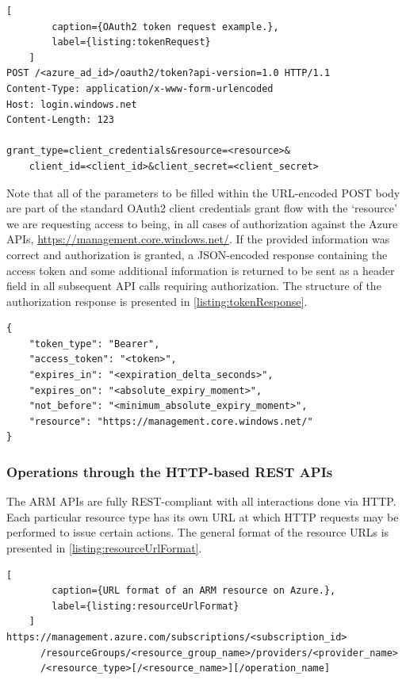\documentclass[11pt]{report}
\begin{document}
\begin{lstlisting}[
        caption={OAuth2 token request example.},
        label={listing:tokenRequest}
    ]
POST /<azure_ad_id>/oauth2/token?api-version=1.0 HTTP/1.1
Content-Type: application/x-www-form-urlencoded
Host: login.windows.net
Content-Length: 123

grant_type=client_credentials&resource=<resource>&
    client_id=<client_id>&client_secret=<client_secret>
\end{lstlisting}

Note that all of the parameters to be filled within the URL-encoded POST body
are part of the standard OAuth2 client credentials grant flow with the
`resource' we are requesting access to being, in all cases of authorization
against the Azure APIs, \url{https://management.core.windows.net/}.
If the provided information was correct and authorization is granted,
a JSON-encoded response containing the access token and some
additional information is returned to be sent as a header field in all
subsequent API calls requiring authorization. The structure of the
authorization response is presented in \autoref{listing:tokenResponse}.

\begin{listing}[H]
\caption{JSON structure of OAuth2 token response.}
\label{listing:tokenResponse}
\begin{verbatim}
{
    "token_type": "Bearer",
    "access_token": "<token>",
    "expires_in": "<expiration_delta_seconds>",
    "expires_on": "<absolute_expiry_moment>",
    "not_before": "<minimum_absolute_expiry_moment>",
    "resource": "https://management.core.windows.net/"
}
\end{verbatim}
\end{listing}

\subsubsection{Operations through the HTTP-based REST APIs}

The ARM APIs are fully REST-compliant with all interactions done via HTTP\@. Each
particular resource type has its own URL at which HTTP requests may be
performed to issue certain actions. The general format of the resource URLs is
presented in \autoref{listing:resourceUrlFormat}.

\begin{lstlisting}[
        caption={URL format of an ARM resource on Azure.},
        label={listing:resourceUrlFormat}
    ]
https://management.azure.com/subscriptions/<subscription_id>
      /resourceGroups/<resource_group_name>/providers/<provider_name>
      /<resource_type>[/<resource_name>][/operation_name]
\end{lstlisting}
\end{document}
